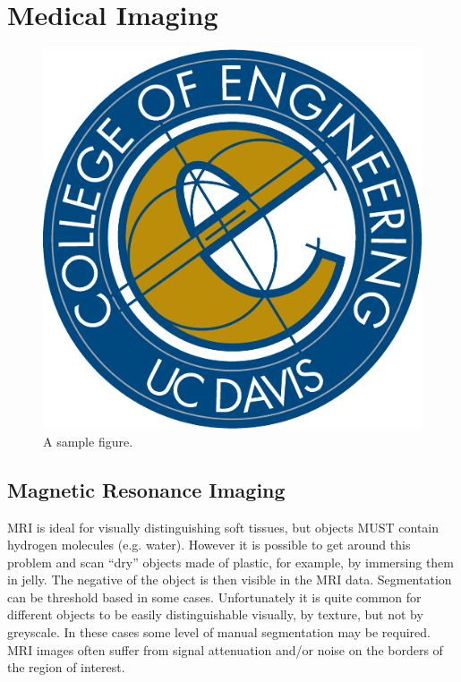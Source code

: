 \chapter{Medical Imaging}
%
\begin{figure}[tbh]
\centering
\includegraphics{media/ucdavisthesis_example_figure}
\caption[First sample figure]{A sample figure.}
\label{fig.sample_1}
\end{figure}

\section{Magnetic Resonance Imaging}
\label{Magnetic Resonance Imaging}

MRI is ideal for visually distinguishing soft tissues, but objects MUST contain hydrogen molecules (e.g. water). However it is possible to get around this problem and scan “dry” objects made of plastic, for example, by immersing them in jelly. The negative of the object is then visible in the MRI data. Segmentation can be threshold based in some cases. Unfortunately it is quite common for different objects to be easily distinguishable visually, by texture, but not by greyscale. In these cases some level of manual segmentation may be required. MRI images often suffer from signal attenuation and/or noise on the borders of the region of interest. \\

